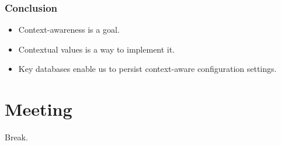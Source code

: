 \begin{frame}
	\frametitle{Conclusion}

	\begin{itemize}[<+-| alert@+>]
	\item Context-awareness is a goal.
	\item Contextual values is a way to implement it.
	\item Key databases enable us to persist context-aware configuration settings.
	\end{itemize}
\end{frame}



\section{Meeting}


\begin{assignment}
	\begin{task}
	Break.
	\end{task}
\end{assignment}


\nocite{raab2017introducing}

\appendix

\begin{frame}[allowframebreaks]
	
	
\end{frame}



